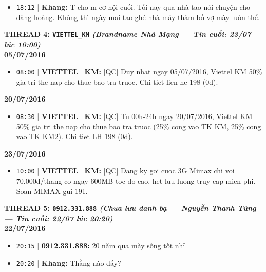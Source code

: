 \documentclass[12pt,a4paper]{article}
\begin{document}
\begin{itemize}[leftmargin=*, itemsep=2pt, topsep=2pt, parsep=0pt]
  \item \texttt{18:12} | \textbf{Khang:} T cho m cơ hội cuối. Tối nay qua nhà tao nói chuyện cho đàng hoàng. Không thì ngày mai tao ghé nhà máy thăm bố vợ mày luôn thể.


\end{itemize}

\vspace{0.3cm}\noindent\textbf{\large  THREAD 4: \texttt{VIETTEL\_KM} \textit{(Brandname Nhà Mạng — Tin cuối: 23/07 lúc 10:00)}}\\[0.15cm]


\textbf{05/07/2016}

\begin{itemize}[leftmargin=*, itemsep=2pt, topsep=2pt, parsep=0pt]
  \item \texttt{08:00} | \textbf{VIETTEL\_KM:} [QC] Duy nhat ngay 05/07/2016, Viettel KM 50\% gia tri the nap cho thue bao tra truoc. Chi tiet lien he 198 (0d).

\end{itemize}
\textbf{20/07/2016}

\begin{itemize}[leftmargin=*, itemsep=2pt, topsep=2pt, parsep=0pt]
  \item \texttt{08:30} | \textbf{VIETTEL\_KM:} [QC] Tu 00h-24h ngay 20/07/2016, Viettel KM 50\% gia tri the nap cho thue bao tra truoc (25\% cong vao TK KM, 25\% cong vao TK KM2). Chi tiet LH 198 (0d).

\end{itemize}
\textbf{23/07/2016}

\begin{itemize}[leftmargin=*, itemsep=2pt, topsep=2pt, parsep=0pt]
  \item \texttt{10:00} | \textbf{VIETTEL\_KM:} [QC] Dang ky goi cuoc 3G Mimax chi voi 70.000d/thang co ngay 600MB toc do cao, het luu luong truy cap mien phi. Soan MIMAX gui 191.


\end{itemize}

\vspace{0.3cm}\noindent\textbf{\large  THREAD 5: \texttt{0912.331.888} \textit{(Chưa lưu danh bạ — Nguyễn Thanh Tùng — Tin cuối: 22/07 lúc 20:20)}}\\[0.15cm]


\textbf{22/07/2016}

\begin{itemize}[leftmargin=*, itemsep=2pt, topsep=2pt, parsep=0pt]
  \item \texttt{20:15} | \textbf{0912.331.888:} 20 năm qua mày sống tốt nhỉ
  \item \texttt{20:20} | \textbf{Khang:} Thằng nào đấy?


\end{itemize}
\end{document}
